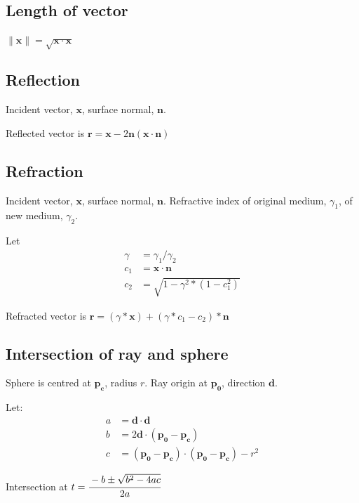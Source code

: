 \documentclass{article}
\begin{document}
        \subsection{Length of vector}
            $\lVert\mathbf{x}\rVert = \sqrt{\mathbf{x} \cdot \mathbf{x}}$
        \subsection{Reflection}
            Incident vector, $\mathbf{x}$, surface normal, $\mathbf{n}$.
            
            Reflected vector is $\mathbf{r} = \mathbf{x} - 2\mathbf{n}(\mathbf{x}\cdot\mathbf{n})$
        \subsection{Refraction}
            Incident vector, $\mathbf{x}$, surface normal, $\mathbf{n}$. 
            Refractive index of original medium, $\gamma_1$, of new medium, $\gamma_2$.
            
            Let
            \begin{align*}
                \gamma &= \gamma_1 / \gamma_2\\
                c_1 &= \mathbf{x}\cdot\mathbf{n}\\
                c_2 &= \sqrt{1 - \gamma^2 * (1 - c_1^2)}
            \end{align*}
            
            Refracted vector is $\mathbf{r} = (\gamma * \mathbf{x}) + (\gamma * c_1 - c_2) * \mathbf{n}$
        \subsection{Intersection of ray and sphere}
            Sphere is centred at $\mathbf{p_c}$, radius $r$.
            Ray origin at $\mathbf{p_0}$, direction $\mathbf{d}$.
            
            Let:
            \begin{align*}
                a &= \mathbf{d} \cdot \mathbf{d}\\
                b &= 2 \mathbf{d} \cdot (\mathbf{p_0} - \mathbf{p_c})\\
                c &= (\mathbf{p_0} - \mathbf{p_c}) \cdot (\mathbf{p_0} - \mathbf{p_c}) - r^2
            \end{align*}
            
            Intersection at $t = \cfrac{-b \pm \sqrt{b^2 - 4 a c}}{2 a}$
\end{document}
